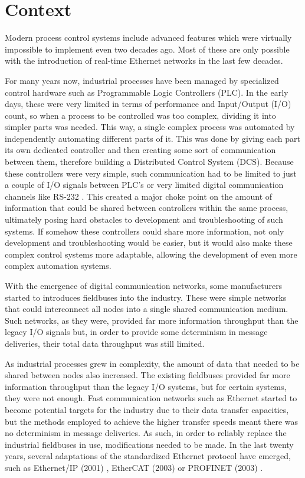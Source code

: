 \section{Context} \label{sec:context}

Modern process control systems include advanced features which were virtually impossible to implement even two decades ago.
Most of these are only possible with the introduction of real-time Ethernet networks in the last few decades.

For many years now, industrial processes have been managed by specialized control hardware such as Programmable Logic Controllers (PLC).
In the early days, these were very limited in terms of performance and Input/Output (I/O) count, so when a process to be controlled was too complex, dividing it into simpler parts was needed.
This way, a single complex process was automated by independently automating different parts of it.
This was done by giving each part its own dedicated controller and then creating some sort of communication between them, therefore building a Distributed Control System (DCS).
Because these controllers were very simple, such communication had to be limited to just a couple of I/O signals between PLC's or very limited digital communication channels like RS-232 \cite{protocol:rs232}.
This created a major choke point on the amount of information that could be shared between controllers within the same process, ultimately posing hard obstacles to development and troubleshooting of such systems.
If somehow these controllers could share more information, not only development and troubleshooting would be easier, but it would also make these complex control systems more adaptable, allowing the development of even more complex automation systems.

With the emergence of digital communication networks, some manufacturers started to introduces fieldbuses into the industry.
These were simple networks that could interconnect all nodes into a single shared communication medium.
Such networks, as they were, provided far more information throughput than the legacy I/O signals but, in order to provide some determinism in message deliveries, their total data throughput was still limited.

As industrial processes grew in complexity, the amount of data that needed to be shared between nodes also increased.
The existing fieldbuses provided far more information throughput than the legacy I/O systems, but for certain systems, they were not enough.
Fast communication networks such as Ethernet \cite{protocol:ethernet} started to become potential targets for the industry due to their data transfer capacities, but the methods employed to achieve the higher transfer speeds meant there was no determinism in message deliveries.
As such, in order to reliably replace the industrial fieldbuses in use, modifications needed to be made.
In the last twenty years, several adaptations of the standardized Ethernet protocol have emerged, such as Ethernet/IP (2001) \cite{protocol:ethernetip}, EtherCAT (2003) \cite{protocol:ethercat} or PROFINET (2003) \cite{protocol:profinet}.

